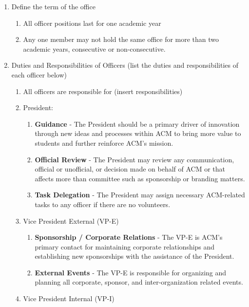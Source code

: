 \documentclass[11pt,a4paper,notitlepage]{article}
\begin{document}
\begin{enumerate}[label=\Alph*.]
  \item Define the term of the office
    \begin{enumerate}[label=\arabic*.]
      \item All officer positions last for one academic year
      \item Any one member may not hold the same office for more than two
      academic years, consecutive or non-consecutive.
    \end{enumerate}
  \item Duties and Responsibilities of Officers (list the duties and
  responsibilities of each officer below)
    \begin{enumerate}[label=\arabic*.]
      \item All officers are responsible for (insert responsibilities)
      \item President:
        \begin{enumerate}[label=\alph*.]
          \item \textbf{Guidance} - The President should be a primary driver of
            innovation through new ideas and processes within ACM to bring more
            value to students and further reinforce ACM's mission.
          \item \textbf{Official Review} - The President may review any
            communication, official or unofficial, or decision made on behalf of
            ACM or that affects more than committee such as sponsorship or
            branding matters.
          \item \textbf{Task Delegation} - The President may assign necessary
            ACM-related tasks to any officer if there are no volunteers.
        \end{enumerate}
      \item Vice President External (VP-E)
        \begin{enumerate}[label=\alph*.]
          \item \textbf{Sponsorship / Corporate Relations} - The VP-E is ACM's
            primary contact for maintaining corporate relationships and
            establishing new sponsorships with the assistance of the President. 
          \item \textbf{External Events} - The VP-E is responsible for
            organizing and planning all corporate, sponsor, and
            inter-organization related events.
        \end{enumerate}
      \item Vice President Internal (VP-I)
        \begin{enumerate}[label=\alph*.]

\end{enumerate}
\end{enumerate}
\end{enumerate}
\end{document}
